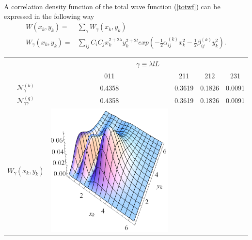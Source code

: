 \documentclass[12pt,a4paper,twoside]{article}
\begin{document}
A correlation density function of the total wave function (\ref{totwf})  can be expressed in the following way
\begin{align}
W\left( x_k,y_k \right) =& \sum_{\gamma} W_{\gamma}\left( x_k,y_k \right) \nonumber \\
W_{\gamma}\left( x_k,y_k \right) =& \sum_{ij} C_i C_j x^{2+2\lambda}_k y^{2+2l}_k exp\left( - \tfrac{1}{2} \alpha^{(k)}_{ij} x_k^2 -  \tfrac{1}{2} \beta^{(k)}_{ij} y_k^2 \right) .
\end{align}
 

\begin{table}[]
\footnotesize
\begin{tabular}{@{}ccccc@{}}
\toprule
                                    & \multicolumn{4}{c}{$\gamma \equiv \lambda l L$} \\
                                    & 011     & 211     & 212     & 231               \\ \midrule
$\mathcal{N}_{\gamma}^{(k)}$        & 0.4358  & 0.3619  & 0.1826  & 0.0091            \\
$\mathcal{N}_{\gamma \gamma}^{(q)}$ & 0.4358  & 0.3619  & 0.1826  & 0.0091            \\
$W_{\gamma}\left(x_k,y_k\right)$    
&\includegraphics[scale=0.5]{W1_1}         

\end{tabular}
\end{table}
\end{document}
